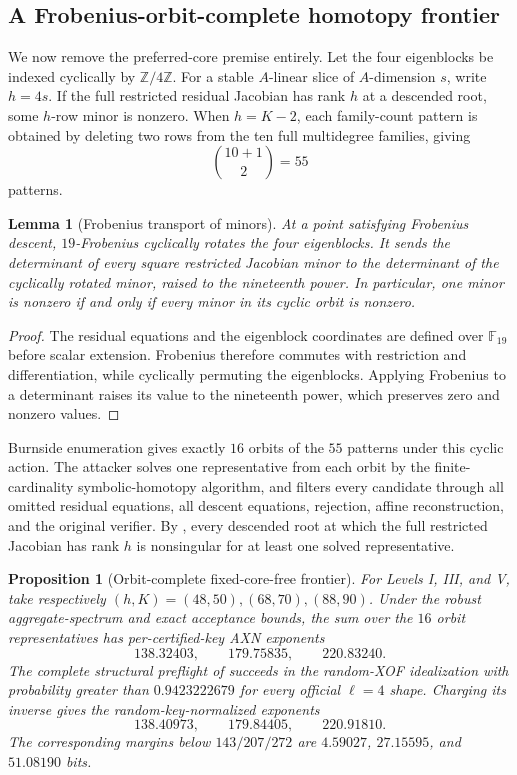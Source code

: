 \documentclass[11pt]{article}
\newtheorem{lemma}[lemma]{Lemma}
\newtheorem{proposition}[proposition]{Proposition}
\newcommand{\F}{\mathbb F}
\begin{document}
\subsection{A Frobenius-orbit-complete homotopy frontier}
\label{sec:basis-complete-homotopy}

We now remove the preferred-core premise entirely.  Let the four eigenblocks be
indexed cyclically by $\mathbb Z/4\mathbb Z$.  For a stable $A$-linear slice of
$A$-dimension $s$, write $h=4s$.  If the full restricted residual Jacobian has
rank $h$ at a descended root, some $h$-row minor is nonzero.  When $h=K-2$,
each family-count pattern is obtained by deleting two rows from the ten full
multidegree families, giving
\[
  \binom{10+1}{2}=55
\]
patterns.

\begin{lemma}[Frobenius transport of minors]
\label{lem:frobenius-minor-transport}
At a point satisfying Frobenius descent, $19$-Frobenius cyclically rotates the
four eigenblocks.  It sends the determinant of every square restricted
Jacobian minor to the determinant of the cyclically rotated minor, raised to
the nineteenth power.  In particular, one minor is nonzero if and only if
every minor in its cyclic orbit is nonzero.
\end{lemma}

\begin{proof}
The residual equations and the eigenblock coordinates are defined over
$\F_{19}$ before scalar extension.  Frobenius therefore commutes with
restriction and differentiation, while cyclically permuting the eigenblocks.
Applying Frobenius to a determinant raises its value to the nineteenth power,
which preserves zero and nonzero values.
\end{proof}

Burnside enumeration gives exactly $16$ orbits of the $55$ patterns under this
cyclic action.  The attacker solves one representative from each orbit by the
finite-cardinality symbolic-homotopy algorithm, and filters every candidate
through all omitted residual equations, all descent equations, rejection,
affine reconstruction, and the original verifier.  By
, every descended root at which the full
restricted Jacobian has rank $h$ is nonsingular for at least one solved
representative.

\begin{proposition}[Orbit-complete fixed-core-free frontier]
\label{prop:selected-homotopy-frontier}
For Levels I, III, and V, take respectively $(h,K)=(48,50),(68,70),(88,90)$.
Under the robust aggregate-spectrum and exact acceptance bounds, the sum over
the $16$ orbit representatives has per-certified-key AXN exponents
\[
  138.32403,\qquad 179.75835,\qquad 220.83240.
\]
The complete structural preflight of 
succeeds in the random-XOF idealization with probability greater than
$0.9423222679$ for every official $\ell=4$ shape.  Charging its inverse gives
the random-key-normalized exponents
\[
  138.40973,\qquad 179.84405,\qquad 220.91810.
\]
The corresponding margins below $143/207/272$ are $4.59027$, $27.15595$, and
$51.08190$ bits.
\end{proposition}
\end{document}
